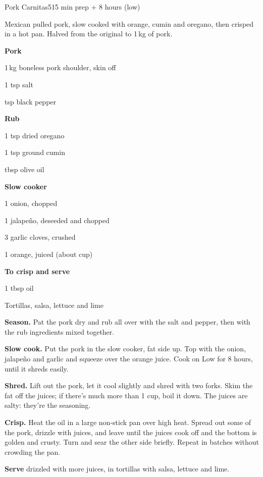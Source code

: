 \begin{recipebox}{Pork Carnitas}{5}{15 min prep + 8 hours (low)}

Mexican pulled pork, slow cooked with orange, cumin and oregano, then crisped in
a hot pan. Halved from the original to 1\,kg of pork.

\begin{ingredients}
  \item[] \textbf{Pork}
  \item 1\,kg boneless pork shoulder, skin off
  \item 1 tsp salt
  \item {} tsp black pepper
  \item[] \textbf{Rub}
  \item 1 tsp dried oregano
  \item 1 tsp ground cumin
  \item {} tbsp olive oil
  \item[] \textbf{Slow cooker}
  \item 1 onion, chopped
  \item 1 jalapeño, deseeded and chopped
  \item 3 garlic cloves, crushed
  \item 1 orange, juiced (about  cup)
  \item[] \textbf{To crisp and serve}
  \item 1 tbsp oil
  \item Tortillas, salsa, lettuce and lime
\end{ingredients}

\begin{method}
  \item \textbf{Season.} Pat the pork dry and rub all over with the salt and pepper,
        then with the rub ingredients mixed together.
  \item \textbf{Slow cook.} Put the pork in the slow cooker, fat side up. Top with the
        onion, jalapeño and garlic and squeeze over the orange juice. Cook on Low
        for 8 hours, until it shreds easily.
  \item \textbf{Shred.} Lift out the pork, let it cool slightly and shred with two
        forks. Skim the fat off the juices; if there's much more than 1 cup, boil it
        down. The juices are salty: they're the seasoning.
  \item \textbf{Crisp.} Heat the oil in a large non-stick pan over high heat. Spread
        out some of the pork, drizzle with juices, and leave until the juices cook
        off and the bottom is golden and crusty. Turn and sear the other side
        briefly. Repeat in batches without crowding the pan.
  \item \textbf{Serve} drizzled with more juices, in tortillas with salsa, lettuce
        and lime.
\end{method}


\end{recipebox}
